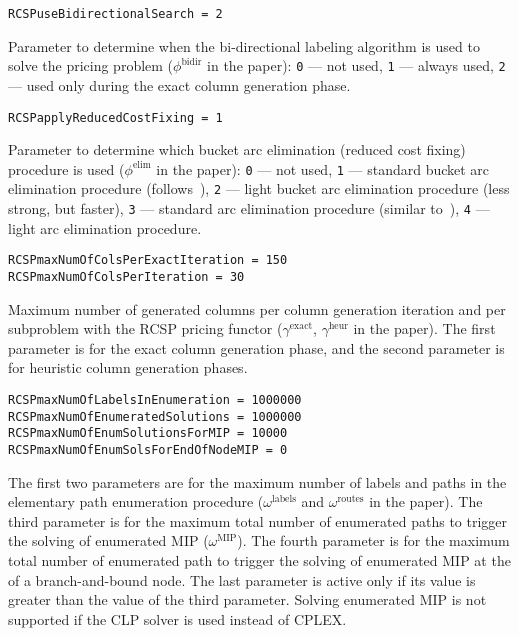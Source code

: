 \documentclass[10pt,a4paper]{article}
\begin{document}
\begin{lstlisting}
RCSPuseBidirectionalSearch = 2
\end{lstlisting}
Parameter to determine when the bi-directional labeling algorithm is used to solve the pricing problem
($\phi^{\mathrm{bidir}}$ in the paper): \verb+0+ --- not used, \verb+1+ --- always used, \verb+2+ --- used only during
the exact column generation phase.

\begin{lstlisting}
RCSPapplyReducedCostFixing = 1
\end{lstlisting}
Parameter to determine which bucket arc elimination (reduced cost fixing) procedure is used ($\phi^{\mathrm{elim}}$ in
the paper): \verb+0+ --- not used, \verb+1+ --- standard bucket arc elimination procedure
(follows~\cite{SadykovUchoaPessoa:21l}), \verb+2+ --- light bucket arc elimination procedure (less strong, but faster),
\verb+3+ --- standard arc elimination procedure (similar to~\cite{IrnichDesaulnieDesrosier:10a}), \verb+4+ --- light arc
elimination procedure.

\begin{lstlisting}
RCSPmaxNumOfColsPerExactIteration = 150
RCSPmaxNumOfColsPerIteration = 30
\end{lstlisting}
Maximum number of generated columns per column generation iteration and per subproblem with the RCSP pricing functor
($\gamma^{\mathrm{exact}}$, $\gamma^{\mathrm{heur}}$ in the paper). The first parameter is for the exact column
generation phase, and the second parameter is for heuristic column generation phases. 

\begin{lstlisting}
RCSPmaxNumOfLabelsInEnumeration = 1000000
RCSPmaxNumOfEnumeratedSolutions = 1000000
RCSPmaxNumOfEnumSolutionsForMIP = 10000
RCSPmaxNumOfEnumSolsForEndOfNodeMIP = 0
\end{lstlisting}
The first two parameters are for the maximum number of labels and paths in the elementary path enumeration procedure
($\omega^{\mathrm{labels}}$ and $\omega^{\mathrm{routes}}$ in the paper). The third parameter is for the maximum total
number of enumerated paths to trigger the solving of enumerated MIP ($\omega^{\mathrm{MIP}}$). The fourth parameter is
for the maximum total number of enumerated path to trigger the solving of enumerated MIP at the of a branch-and-bound
node. The last parameter is active only if its value is greater than the value of the third parameter. Solving enumerated MIP is not supported if the CLP solver is used instead of CPLEX.
\end{document}
